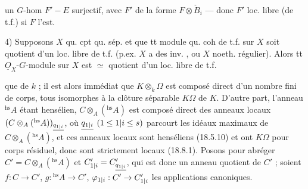 un $G$-hom  $F'-E$ surjectif, avec $F'$ de la forme $F\otimes\check B_i$ --- donc $F'$ loc. libre (de t.f.) si $F$ l'est.

4) Supposons $X$ qu. cpt qu. sép. et que tt module qu. coh de t.f. sur $X$ soit quotient d'un loc. libre de t.f. (p.ex. $X$ a des  inv. , ou $X$ noeth. régulier). Alors tt $\underline O_X$-$G$-module sur $X$ est $\simeq$ quotient d'un loc. libre de t.f.


que de $k$ ; il est alors immédiat que $K\otimes_k\Omega$ est composé direct d'un nombre fini de corps, tous isomorphes à la clôture séparable $K\Omega$ de $K$. D'autre part, l'anneau ${}^{\mathrm{hs}}A$ étant hensélien, $C\otimes_A({}^{\mathrm{hs}}A)$ est composé direct des anneaux locaux $(C\otimes_A({}^{\mathrm{hs}}A))_{\underline{q_{1|i}}}$, où $\underline{q_{1|i}}$ $(1\leq1|i\leq s)$ parcourt les idéaux maximaux de  $C\otimes_A({}^{\mathrm{hs}}A)$, et ces anneaux locaux sont henséliens (18.5.10) et ont $K\Omega$ pour corps résiduel, donc sont strictement locaux (18.8.1). Posons pour abréger $C'=C\otimes_A({}^{\mathrm{hs}}A)$ et $C_{1|i}'=C'_{\underline{q_{1|i}}}$, qui est donc un anneau quotient de $C'$ ; soient $f:C\to C'$, $g:{}^{\mathrm{hs}}A\to C'$, $\varphi_{1|i}:C'\to C_{1|i}'$ les applications canoniques.


